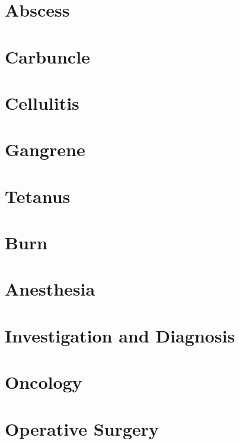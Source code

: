 \documentclass[11pt, a4paper]{article}
\begin{document}
\section{Abscess}

\section{Carbuncle}

\section{Cellulitis}

\section{Gangrene}

\section{Tetanus}

\section{Burn}

\section{Anesthesia}

\section{Investigation and Diagnosis}

\section{Oncology}

\section{Operative Surgery}







\printindex
\end{document}
